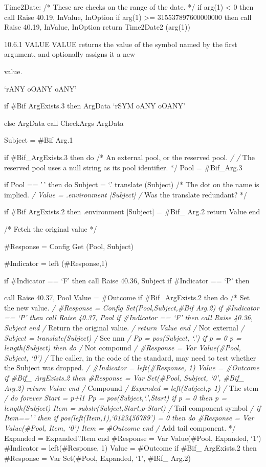 Time2Date: /* These are checks on the range of the date. */ if arg(1)
\textless{} 0 then call Raise 40.19, InValue, InOption if arg(1)
\textgreater= 315537897600000000 then call Raise 40.19, InValue,
InOption return Time2Date2 (arg(1))

10.6.1 VALUE VALUE returns the value of the symbol named by the first
argument, and optionally assigns it a new

value.

`rANY oOANY oANY'

if \#Bif ArgExists.3 then ArgData `rSYM oANY oOANY'

else ArgData call CheckArgs ArgData

Subject = \#Bif Arg.1

if \#Bif\_ArgExists.3 then do /* An external pool, or the reserved pool.
\emph{/ /} The reserved pool uses a null string as its pool identifier.
*/ Pool = \#Bif\_Arg.3

if Pool == '\,' then do Subject = `.' \textbar\textbar{} translate
(Subject) /* The dot on the name is implied. \emph{/ Value =
.environment {[}Subject{]} /} Was the translate redundant? */

if \#Bif ArgExists.2 then .environment {[}Subject{]} = \#Bif\_ Arg.2
return Value end

/* Fetch the original value */

\#Response = Config Get (Pool, Subject)

\#Indicator = left (\#Response,1)

if \#Indicator == `F' then call Raise 40.36, Subject if \#Indicator ==
`P' then

call Raise 40.37, Pool Value = \#Outcome if \#Bif\_ArgExists.2 then do
/* Set the new value. \emph{/ \#Response = Config Set(Pool,Subject,\#Bif
Arg.2) if \#Indicator == `P' then call Raise 40.37, Pool if \#Indicator
== `F' then call Raise 40.36, Subject end /} Return the original value.
\emph{/ return Value end /} Not external \emph{/ Subject =
translate(Subject) /} See nnn \emph{/ Pp = pos(Subject, `.') if p = 0
\textbar{} p = length(Subject) then do /} Not compound \emph{/
\#Response = Var Value(\#Pool, Subject, `0') /} The caller, in the code
of the standard, may need to test whether the Subject was dropped.
\emph{/ \#Indicator = left(\#Response, 1) Value = \#Outcome if \#Bif\_
ArgExists.2 then \#Response = Var Set(\#Pool, Subject, `0', \#Bif\_
Arg.2) return Value end /} Compound \emph{/ Expanded = left(Subject,p-1)
/} The stem \emph{/ do forever Start = p+l1 Pp = pos(Subject,`.',Start)
if p = 0 then p = length(Subject) Item = substr(Subject,Start,p-Start)
/} Tail component symbol \emph{/ if Item=='\,' then if
pos(left(Item,1),`0123456789') = 0 then do \#Response = Var
Value(\#Pool, Item, `0') Item = \#Outcome end /} Add tail component. */
Expanded = Expanded'.'Item end \#Response = Var Value(\#Pool, Expanded,
`1') \#Indicator = left(\#Response, 1) Value = \#Outcome if \#Bif\_
ArgExists.2 then \#Response = Var Set(\#Pool, Expanded, `1', \#Bif\_
Arg.2)

